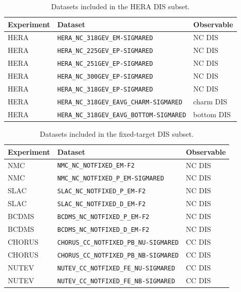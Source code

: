 \documentclass[11pt,a4paper]{article}
\begin{document}
\begin{table}[htbp]
\centering
\small
\begin{tabular}{lll}
\toprule
Experiment & Dataset & Observable \\
\midrule
HERA & \texttt{HERA\_NC\_318GEV\_EM-SIGMARED} & NC DIS \\
HERA & \texttt{HERA\_NC\_225GEV\_EP-SIGMARED} & NC DIS \\
HERA & \texttt{HERA\_NC\_251GEV\_EP-SIGMARED} & NC DIS \\
HERA & \texttt{HERA\_NC\_300GEV\_EP-SIGMARED} & NC DIS \\
HERA & \texttt{HERA\_NC\_318GEV\_EP-SIGMARED} & NC DIS \\
HERA & \texttt{HERA\_NC\_318GEV\_EAVG\_CHARM-SIGMARED} & charm DIS \\
HERA & \texttt{HERA\_NC\_318GEV\_EAVG\_BOTTOM-SIGMARED} & bottom DIS \\
\bottomrule
\end{tabular}
\caption{Datasets included in the HERA DIS subset.}
\label{tab:HERA}
\end{table}


\begin{table}[htbp]
\centering
\small
\begin{tabular}{lll}
\toprule
Experiment & Dataset & Observable \\
\midrule
NMC & \texttt{NMC\_NC\_NOTFIXED\_EM-F2} & NC DIS \\
NMC & \texttt{NMC\_NC\_NOTFIXED\_P\_EM-SIGMARED} & NC DIS \\
SLAC & \texttt{SLAC\_NC\_NOTFIXED\_P\_EM-F2} & NC DIS \\
SLAC & \texttt{SLAC\_NC\_NOTFIXED\_D\_EM-F2} & NC DIS \\
BCDMS & \texttt{BCDMS\_NC\_NOTFIXED\_P\_EM-F2} & NC DIS \\
BCDMS & \texttt{BCDMS\_NC\_NOTFIXED\_D\_EM-F2} & NC DIS \\
CHORUS & \texttt{CHORUS\_CC\_NOTFIXED\_PB\_NU-SIGMARED} & CC DIS \\
CHORUS & \texttt{CHORUS\_CC\_NOTFIXED\_PB\_NB-SIGMARED} & CC DIS \\
NUTEV & \texttt{NUTEV\_CC\_NOTFIXED\_FE\_NU-SIGMARED} & CC DIS \\
NUTEV & \texttt{NUTEV\_CC\_NOTFIXED\_FE\_NB-SIGMARED} & CC DIS \\
\bottomrule
\end{tabular}
\caption{Datasets included in the fixed-target DIS subset.}
\label{tab:fixed_target}
\end{table}
\end{document}

